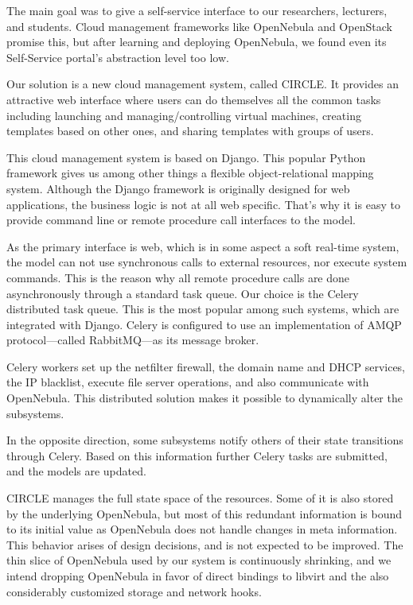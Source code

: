 \documentclass{llncs}
\begin{document}
The main goal was to give a self-service interface to our researchers, lecturers, and students.
Cloud management frameworks like OpenNebula and OpenStack promise this, but after learning and deploying OpenNebula, we found even its Self-Service portal's abstraction level too low.

Our solution is a new cloud management system, called CIRCLE. It provides an attractive web interface where users can do themselves all the common tasks including launching and managing/controlling virtual machines, creating templates based on other ones, and sharing templates with groups of users.

This cloud management system is based on Django\cite{holovaty2009definitive}. This popular Python framework gives us among other things a flexible object-relational mapping system. Although the Django framework is originally designed for web applications, the business logic is not at all web specific. That's why it is easy to provide command line or remote procedure call interfaces to the model.

As the primary interface is web, which is in some aspect a soft real-time system, the model can not use synchronous calls to external resources, nor execute system commands. This is the reason why all remote procedure calls are done asynchronously through a standard task queue. Our choice is the Celery distributed task queue. This is the most popular among such systems, which are integrated with Django. Celery is configured to use an implementation of AMQP\cite{vinoski2006advanced} protocol---called RabbitMQ---as its message broker.

Celery workers set up the netfilter firewall, the domain name and DHCP services, the IP blacklist, execute file server operations, and also communicate with OpenNebula. This distributed solution makes it possible to dynamically alter the subsystems.

In the opposite direction, some subsystems notify others of their state transitions through Celery. Based on this information further Celery tasks are submitted, and the models are updated.

CIRCLE manages the full state space of the resources. Some of it is also stored by the underlying OpenNebula, but most of this redundant information is bound to its initial value as OpenNebula does not handle changes in meta information. This behavior arises of design decisions, and is not expected to be improved. The thin slice of OpenNebula used by our system is continuously shrinking, and we intend dropping OpenNebula in favor of direct bindings to libvirt and the also considerably customized storage and network hooks.
\end{document}
